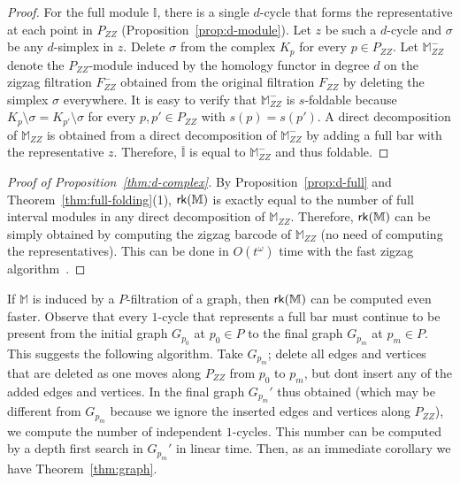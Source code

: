 \documentclass[11pt]{article}
\theoremstyle{plain}%
\newcommand{\Int}{\mathbb{I}}
\newcommand{\M}{\mathbb{M}}
\newcommand{\rk}{{\sf{rk}}}
\begin{document}
{\begin{proof}
    For the full module $\Int$, there is a single $d$-cycle that forms the representative at each point in $P_{ZZ}$ (Proposition~\ref{prop:d-module}). Let $z$ be such a $d$-cycle and $\sigma$ be any $d$-simplex in $z$. Delete $\sigma$ from the complex $K_p$ for every $p\in P_{ZZ}$. Let $\M_{ZZ}^-$ denote the $P_{ZZ}$-module induced by the homology functor in degree $d$ on the zigzag filtration $F_{ZZ}^-$ obtained from the original filtration $F_{ZZ}$ by deleting the simplex $\sigma$ everywhere. It is easy to verify that $\M_{ZZ}^-$ is $s$-foldable because $K_p\setminus \sigma=K_{p'}\setminus \sigma$ for every $p,p'\in P_{ZZ}$ with $s(p)=s(p')$. 
    A direct decomposition of $\M_{ZZ}$ is obtained from a direct decomposition of $\M_{ZZ}^-$ by adding a full bar with the representative $z$. Therefore, $\overline{\Int}$ is equal to $\M_{ZZ}^-$ and thus foldable.
\end{proof}
% 
\begin{proof}[Proof of Proposition~\ref{thm:d-complex}]
    By Proposition~\ref{prop:d-full} and Theorem~\ref{thm:full-folding}(1), $\rk(\M)$ is exactly equal to the number of full interval modules in any direct decomposition of $\M_{ZZ}$. Therefore, $\rk(\M)$ can be simply obtained by computing the zigzag barcode of $\M_{ZZ}$ (no need of computing the representatives). This can be done in $O(t^\omega)$ time with the fast zigzag algorithm~\cite{DH22}. 
\end{proof}

If $\M$ is induced by a $P$-filtration of a graph, then $\rk(\M)$ can be computed even faster. 
Observe that every $1$-cycle that represents a full bar must continue to be present from the initial graph $G_{p_0}$ at $p_0\in P$ to the final graph $G_{p_m}$ at $p_m\in P$. This suggests the following algorithm. Take $G_{p_m}$; delete all edges and vertices that are deleted as one moves along $P_{ZZ}$ from $p_0$ to $p_m$, but dont insert any of the added edges and vertices. In the final graph $G_{p_m}'$ thus obtained (which may be different from $G_{p_m}$ because we ignore the inserted edges and vertices along $P_{ZZ}$), we compute the number of independent $1$-cycles. This number can be computed by a depth first search in $G_{p_m}'$ in linear time. Then, as an immediate corollary we have Theorem~\ref{thm:graph}.
}
\end{document}
